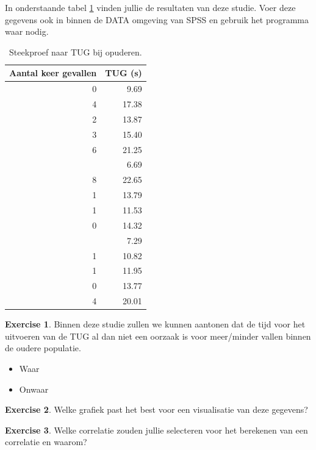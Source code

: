 \documentclass[
]{book}
\providecommand{\tightlist}{%
  \setlength{\itemsep}{0pt}\setlength{\parskip}{0pt}}
\theoremstyle{definition}
\theoremstyle{definition}
\theoremstyle{definition}
\newtheorem{exercise}{Exercise}[chapter]
\theoremstyle{definition}
\theoremstyle{remark}
\begin{document}
In onderstaande tabel \ref{tab:TUG} vinden jullie de resultaten van deze studie. Voer deze gegevens ook in binnen de DATA omgeving van {SPSS} en gebruik het programma waar nodig.

\begin{table}

\caption{\label{tab:TUG}Steekproef naar TUG bij opuderen.}
\centering
\begin{tabular}[t]{rr}
\toprule
Aantal keer gevallen & TUG (s)\\
\midrule
0 & 9.69\\
4 & 17.38\\
2 & 13.87\\
3 & 15.40\\
6 & 21.25\\
\addlinespace
1 & 6.69\\
8 & 22.65\\
1 & 13.79\\
1 & 11.53\\
0 & 14.32\\
\addlinespace
0 & 7.29\\
1 & 10.82\\
1 & 11.95\\
0 & 13.77\\
4 & 20.01\\
\bottomrule
\end{tabular}
\end{table}

\begin{exercise}

Binnen deze studie zullen we kunnen aantonen dat de tijd voor het uitvoeren van de TUG al dan niet een oorzaak is voor meer/minder vallen binnen de oudere populatie.

\begin{itemize}
\tightlist
\item
  Waar
\item
  Onwaar
\end{itemize}

\end{exercise}

\begin{exercise}
Welke grafiek past het best voor een visualisatie van deze gegevens?
\end{exercise}

\begin{exercise}
Welke correlatie zouden jullie selecteren voor het berekenen van een correlatie en waarom?
\end{exercise}
\end{document}
